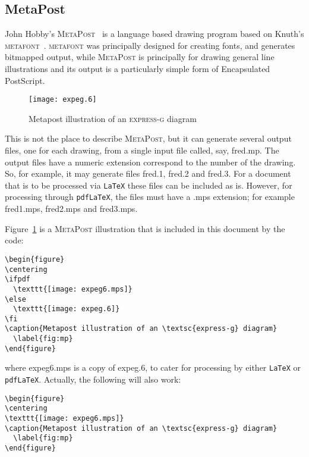 \documentclass[11pt]{article}
\newif\ifpdf
\newcommand{\file}[1]{\textsf{#1}}
\newcommand{\program}[1]{\texttt{#1}}
\newcommand{\mpost}{\textsc{MetaPost}}
\newcommand{\mfont}{\textsc{metafont}}
\begin{document}
\subsection{MetaPost}

    John Hobby's \mpost{}~\cite{HOBBY92} is a language based drawing program
based on Knuth's \mfont~\cite{KNUTH86b}. \mfont{} was principally designed
for creating fonts, and generates bitmapped output, while \mpost{} is
principally for drawing general line illustrations and its output is a
particularly simple form of Encapsulated PostScript.


\begin{figure}
\centering
\ifpdf
  \texttt{[image: expeg6.mps]}
\else
  \texttt{[image: expeg.6]}
\fi
\caption{Metapost illustration of an \textsc{express-g} diagram} 
  \label{fig:mp}
\end{figure}

    This is not the place to describe \mpost, but it can generate several 
output files, one for each drawing, from a single input file called, say, 
\file{fred.mp}. The output files have a numeric extension correspond to the
number of the drawing. So, for example, it may generate files \file{fred.1},
\file{fred.2} and \file{fred.3}. For a document that is to be processed via
\program{LaTeX} these files can be included as is. However, for processing
through \program{pdfLaTeX}, the files must have a \file{.mps} extension; for
example \file{fred1.mps}, \file{fred2.mps} and \file{fred3.mps}.

    Figure~\ref{fig:mp} is a \mpost{} illustration that is included in
this document by the code:
\begin{verbatim}
\begin{figure}
\centering
\ifpdf
  \texttt{[image: expeg6.mps]}
\else
  \texttt{[image: expeg.6]}
\fi
\caption{Metapost illustration of an \textsc{express-g} diagram} 
  \label{fig:mp}
\end{figure}
\end{verbatim}
where \file{expeg6.mps} is a copy of \file{expeg.6}, 
to cater for processing by either \program{LaTeX} or \program{pdfLaTeX}.
Actually, the following will also work:
\begin{verbatim}
\begin{figure}
\centering
\texttt{[image: expeg6.mps]}
\caption{Metapost illustration of an \textsc{express-g} diagram} 
  \label{fig:mp}
\end{figure}
\end{verbatim}
\end{document}
